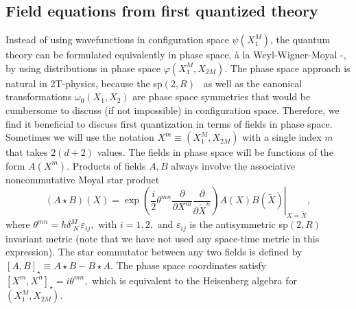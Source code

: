\documentclass[a4paper,12pt]{article}
\begin{document}
\subsection{Field equations from first quantized theory}

Instead of using wavefunctions in configuration space $\psi \left(
X_{1}^{M}\right) $, the quantum theory can be formulated equivalently in
phase space, \`{a} la Weyl-Wigner-Moyal \cite{weyl}-\cite{moyal}, by using
distributions in phase space $\varphi \left( X_{1}^{M},X_{2M}\right) $. The
phase space approach is natural in 2T-physics, because the sp$\left(
2,R\right) $ \ as well as the canonical transformations $\omega _{0}\left(
X_{1},X_{2}\right) $ are phase space symmetries that would be cumbersome to
discuss (if not impossible) in configuration space. Therefore, we find it
beneficial to discuss first quantization in terms of fields in phase space.
Sometimes we will use the notation $X^{m}\equiv \left(
X_{1}^{M},X_{2M}\right) $ with a single index $m$ that takes $2(d+2)$
values. The fields in phase space will be functions of the form $A\left(
X^{m}\right) .$ Products of fields $A,B$ always involve the associative
noncommutative Moyal star product 
\begin{equation}
\left( A\star B\right) \left( X\right) =\left. \exp \left( \frac{i}{2}\theta
^{mn}\frac{\partial }{\partial X^{m}}\frac{\partial }{\partial \tilde{X}^{n}}%
\right) A\left( X\right) B\left( \tilde{X}\right) \right| _{X=\tilde{X}},
\end{equation}
where $\theta ^{mn}=\hbar \delta _{\,\,N}^{M}\,\varepsilon _{ij},$ with $%
i=1,2,$ and $\varepsilon _{ij}$ is the antisymmetric sp$\left( 2,R\right) $
invariant metric (note that we have not used any space-time metric in this
expression). The star commutator between any two fields is defined by $\left[
A,B\right] _{\star }\equiv A\star B-B\star A.$ The phase space coordinates
satisfy $\left[ X^{m},X^{n}\right] _{\star }=i\theta ^{mn},$ which is
equivalent to the Heisenberg algebra for $\left( X_{1}^{M},X_{2M}\right) .$
\end{document}
